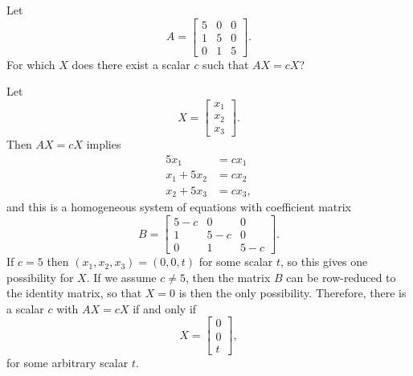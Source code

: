  Let
\begin{equation*}
  A =
  \begin{bmatrix}
    5 & 0 & 0 \\
    1 & 5 & 0 \\
    0 & 1 & 5
  \end{bmatrix}.
\end{equation*}
For which $X$ does there exist a scalar $c$ such that $AX = cX$?
\begin{solution}
  Let
  \begin{equation*}
    X =
    \begin{bmatrix}
      x_1 \\
      x_2 \\
      x_3
    \end{bmatrix}.
  \end{equation*}
  Then $AX = cX$ implies
  \begin{align*}
    5x_1 &= cx_1 \\
    x_1 + 5x_2 &= cx_2 \\
    x_2 + 5x_3 &= cx_3,
  \end{align*}
  and this is a homogeneous system of equations with coefficient
  matrix
  \begin{equation*}
    B =
    \begin{bmatrix}
      5 - c & 0 & 0 \\
      1 & 5 - c & 0 \\
      0 & 1 & 5 - c
    \end{bmatrix}.
  \end{equation*}
  If $c = 5$ then $(x_1,x_2,x_3) = (0,0,t)$ for some scalar $t$, so
  this gives one possibility for $X$. If we assume $c\neq5$, then the
  matrix $B$ can be row-reduced to the identity matrix, so that
  $X = 0$ is then the only possibility. Therefore, there is a scalar
  $c$ with $AX = cX$ if and only if
  \begin{equation*}
    X =
    \begin{bmatrix}
      0 \\
      0 \\
      t
    \end{bmatrix},
  \end{equation*}
  for some arbitrary scalar $t$.
\end{solution}

